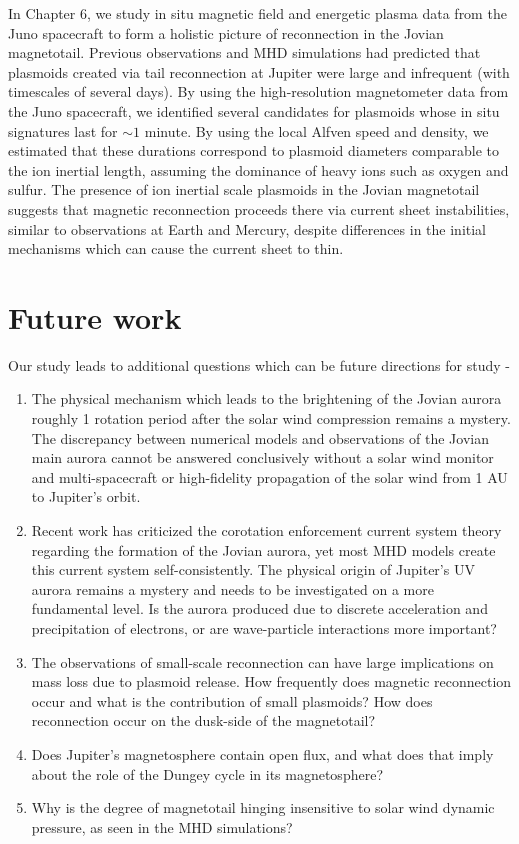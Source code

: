 In Chapter 6, we study in situ magnetic field and energetic plasma data from the Juno spacecraft to form a holistic picture of reconnection in the Jovian magnetotail. Previous observations and MHD simulations had predicted that plasmoids created via tail reconnection at Jupiter were large and infrequent (with timescales of several days). By using the high-resolution magnetometer data from the Juno spacecraft, we identified several candidates for plasmoids whose in situ signatures last for $\sim1$ minute. By using the local Alfven speed and density, we estimated that these durations correspond to plasmoid diameters comparable to the ion inertial length, assuming the dominance of heavy ions such as oxygen and sulfur. The presence of ion inertial scale plasmoids in the Jovian magnetotail suggests that magnetic reconnection proceeds there via current sheet instabilities, similar to observations at Earth and Mercury, despite differences in the initial mechanisms which can cause the current sheet to thin. 

\section{Future work}

Our study leads to additional questions which can be future directions for study - 

\begin{enumerate}
    \item The physical mechanism which leads to the brightening of the Jovian aurora roughly 1 rotation period after the solar wind compression remains a mystery. The discrepancy between numerical models and observations of the Jovian main aurora cannot be answered conclusively without a solar wind monitor and multi-spacecraft or high-fidelity propagation of the solar wind from 1 AU to Jupiter's orbit.
    
    \item Recent work has criticized the corotation enforcement current system theory \cite{Bonfond2020SixJupiter} regarding the formation of the Jovian aurora, yet most MHD models create this current system self-consistently. The physical origin of Jupiter's UV aurora remains a mystery and needs to be investigated on a more fundamental level. Is the aurora produced due to discrete acceleration and precipitation of electrons, or are wave-particle interactions more important?
    
    \item The observations of small-scale reconnection can have large implications on mass loss due to plasmoid release. How frequently does magnetic reconnection occur and what is the contribution of small plasmoids? How does reconnection occur on the dusk-side of the magnetotail?
    
    \item Does Jupiter's magnetosphere contain open flux, and what does that imply about the role of the Dungey cycle in its magnetosphere?
    
    \item Why is the degree of magnetotail hinging insensitive to solar wind dynamic pressure, as seen in the MHD simulations? 
\end{enumerate}